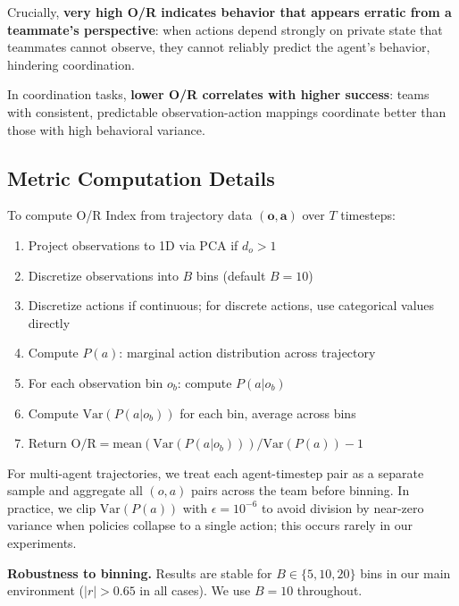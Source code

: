 \documentclass[twoside]{article}
\theoremstyle{remark}
\begin{document}
Crucially, \textbf{very high O/R indicates behavior that appears erratic from a teammate's perspective}: when actions depend strongly on private state that teammates cannot observe, they cannot reliably predict the agent's behavior, hindering coordination.

In coordination tasks, \textbf{lower O/R correlates with higher success}: teams with consistent, predictable observation-action mappings coordinate better than those with high behavioral variance.



\subsection{Metric Computation Details}
\label{subsec:computation}

To compute O/R Index from trajectory data $(\mathbf{o}, \mathbf{a})$ over $T$ timesteps:

\begin{enumerate}
    \item Project observations to 1D via PCA if $d_o > 1$
    \item Discretize observations into $B$ bins (default $B=10$)
    \item Discretize actions if continuous; for discrete actions, use categorical values directly
    \item Compute $P(a)$: marginal action distribution across trajectory
    \item For each observation bin $o_b$: compute $P(a|o_b)$
    \item Compute $\text{Var}(P(a|o_b))$ for each bin, average across bins
    \item Return $\text{O/R} = \text{mean}(\text{Var}(P(a|o_b))) / \text{Var}(P(a)) - 1$
\end{enumerate}

For multi-agent trajectories, we treat each agent-timestep pair as a separate sample and aggregate all $(o, a)$ pairs across the team before binning. In practice, we clip $\text{Var}(P(a))$ with $\epsilon = 10^{-6}$ to avoid division by near-zero variance when policies collapse to a single action; this occurs rarely in our experiments.

\textbf{Robustness to binning.} Results are stable for $B \in \{5, 10, 20\}$ bins in our main environment ($|r| > 0.65$ in all cases). We use $B = 10$ throughout.
\end{document}
